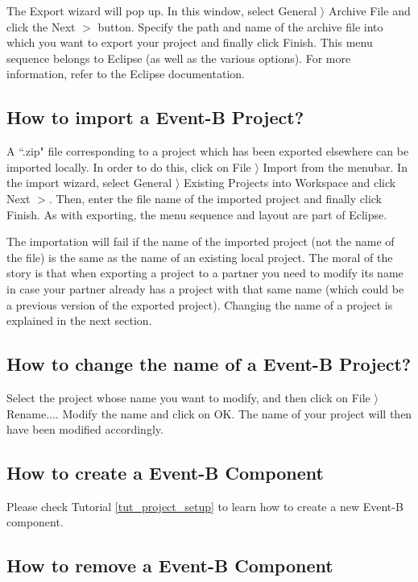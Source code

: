 The Export wizard will pop up. In this window, select \textsf{General $\rangle$ Archive File} and click the \textsf{Next $>$} button. Specify the path and name of the archive file into which you want to export your project and finally click \textsf{Finish}. This menu sequence belongs to Eclipse (as well as the various options). For more information, refer to the Eclipse documentation. 

\subsection{How to import a Event-B Project?}

A ``.zip" file corresponding to a project which has been exported elsewhere can be imported locally. In order to do this, click on \textsf{File $\rangle$ Import} from the menubar. In the import wizard, select \textsf{General $\rangle$ Existing Projects into Workspace} and click \textsf{Next $>$}. Then, enter the file name of the imported project and finally click \textsf{Finish}. As with exporting, the menu sequence and layout are part of Eclipse.

The importation will fail if the name of the imported project (not the name of the file) is the same as the name of an existing local project. The moral of the story is that when exporting a project to a partner you need to modify its name in case your partner already has a project with that same name (which could be a previous version of the exported project). Changing the name of a project is explained in the next section. 

\subsection{How to change the name of a Event-B Project?}

Select the project whose name you want to modify, and then click on \textsf{File $\rangle$ Rename...}. Modify the name and click on \textsf{OK}. The name of your project will then have been modified accordingly. 

\subsection{How to create a Event-B Component}

Please check Tutorial \ref{tut_project_setup} to learn how to create a new Event-B component.

\subsection{How to remove a Event-B Component}

